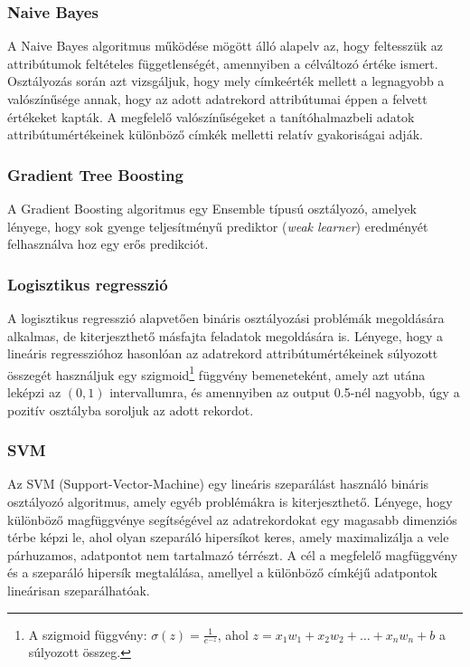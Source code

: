 \documentclass[12pt]{article}
\begin{document}
\subsubsection{Naive Bayes}

A Naive Bayes algoritmus működése mögött álló alapelv az, hogy feltesszük az attribútumok feltételes függetlenségét, amennyiben a célváltozó értéke ismert. Osztályozás során azt vizsgáljuk, hogy mely címkeérték mellett a legnagyobb a valószínűsége annak, hogy az adott adatrekord attribútumai éppen a felvett értékeket kapták. A megfelelő valószínűségeket a tanítóhalmazbeli adatok attribútumértékeinek különböző címkék melletti relatív gyakoriságai adják.

\subsubsection{Gradient Tree Boosting}

A Gradient Boosting algoritmus egy Ensemble típusú osztályozó, amelyek lényege, hogy sok gyenge teljesítményű prediktor (\textit{weak learner}) eredményét felhasználva hoz egy erős predikciót. 

\subsubsection{Logisztikus regresszió}

A logisztikus regresszió alapvetően bináris osztályozási problémák megoldására alkalmas, de kiterjeszthető másfajta feladatok megoldására is. Lényege, hogy a lineáris regresszióhoz hasonlóan az adatrekord attribútumértékeinek súlyozott összegét használjuk egy szigmoid\footnote{A szigmoid függvény: $\sigma(z)=\frac{1}{e^{-z}}$, ahol $z=x_1w_1+x_2w_2+ \dots +x_nw_n+b$ a súlyozott összeg.} függvény bemeneteként, amely azt utána leképzi az $\left(0,1\right)$ intervallumra, és amennyiben az output 0.5-nél nagyobb, úgy a pozitív osztályba soroljuk az adott rekordot.

\subsubsection{SVM}

Az SVM (Support-Vector-Machine) egy lineáris szeparálást használó bináris osztályozó algoritmus, amely egyéb problémákra is kiterjeszthető. Lényege, hogy különböző magfüggvénye segítségével az adatrekordokat egy magasabb dimenziós térbe képzi le, ahol olyan szeparáló hipersíkot keres, amely maximalizálja a vele párhuzamos, adatpontot nem tartalmazó térrészt. A cél a megfelelő magfüggvény és a szeparáló hipersík megtalálása, amellyel a különböző címkéjű adatpontok lineárisan szeparálhatóak.
\end{document}
